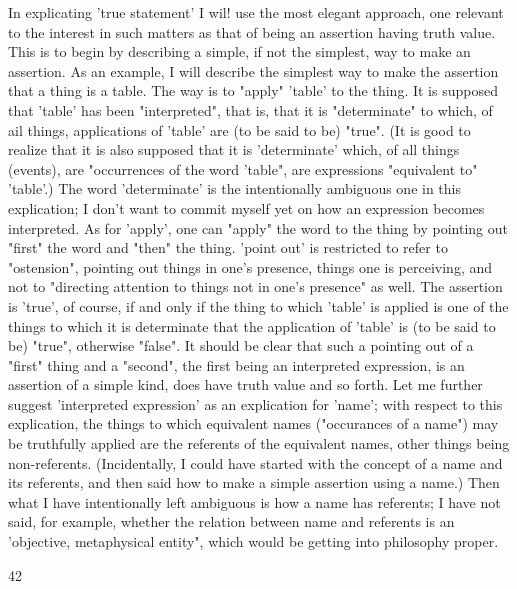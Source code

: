 \documentclass[10pt,twoside]{memoir}
\begin{document}
\begin{enumerate}
{{{{{{{In explicating 'true statement' I wil! use the most elegant approach, one 
relevant to the interest in such matters as that of being an assertion having 
truth value. This is to begin by describing a simple, if not the simplest, way 
to make an assertion. As an example, I will describe the simplest way to 
make the assertion that a thing is a table. The way is to "apply" 'table' to 
the thing. It is supposed that 'table' has been "interpreted", that is, that it is 
"determinate" to which, of ail things, applications of 'table' are (to be said 
to be) "true". (It is good to realize that it is also supposed that it is 
'determinate' which, of all things (events), are "occurrences of the word 
'table", are expressions "equivalent to" 'table'.) The word 'determinate' is 
the intentionally ambiguous one in this explication; I don't want to commit 
myself yet on how an expression becomes interpreted. As for 'apply', one 
can "apply" the word to the thing by pointing out "first" the word and 
"then" the thing. 'point out' is restricted to refer to "ostension", pointing 
out things in one's presence, things one is perceiving, and not to "directing 
attention to things not in one's presence" as well. The assertion is 'true', of 
course, if and only if the thing to which 'table' is applied is one of the things 
to which it is determinate that the application of 'table' is (to be said to be) 
"true", otherwise "false". It should be clear that such a pointing out of a 
"first" thing and a "second", the first being an interpreted expression, is an 
assertion of a simple kind, does have truth value and so forth. Let me further 
suggest 'interpreted expression' as an explication for 'name'; with respect to 
this explication, the things to which equivalent names ("occurances of a 
name") may be truthfully applied are the referents of the equivalent names, 
other things being non-referents. (Incidentally, I could have started with the 
concept of a name and its referents, and then said how to make a simple 
assertion using a name.) Then what I have intentionally left ambiguous is 
how a name has referents; I have not said, for example, whether the relation 
between name and referents is an 'objective, metaphysical entity", which 
would be getting into philosophy proper. 


42 


}}}}}}}
\end{enumerate}
\end{document}
